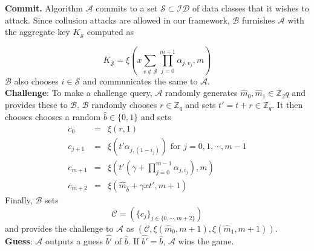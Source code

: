 \noindent\textbf{Commit.} Algorithm $\mathcal{A}$ commits to a set ${\mathcal{S}} \subset \mathcal{ID}$ of data classes that it wishes to attack. Since collusion attacks are allowed in our framework, $\mathcal{B}$ furnishes $\mathcal{A}$ with the aggregate key $K_{\overline{\mathcal{S}}}$ computed as

\begin{equation}
 K_{\overline{\mathcal{S}}} = \xi\left(x\sum_{v\notin\mathcal{S}}{\prod_{j=0}^{m-1}\alpha_{j,v_j}},m\right)\nonumber
\end{equation}
\noindent $\mathcal{B}$ also chooses $i\in\mathcal{S}$ and communicates the same to $\mathcal{A}$.\\

\noindent\textbf{Challenge}: To make a challenge query, $\mathcal{A}$  randomly generates $\hat{m}_0,\hat{m}_1\in\mathbb{Z}_2q$ and provides these to $\mathcal{B}$. $\mathcal{B}$ randomly chooses $r\in\mathbb{Z}_q$ and sets $t'=t+r \in\mathbb{Z}_q$. It then chooses chooses a random $\hat{b}\in\{0,1\}$ and sets
\begin{eqnarray}
 c_0&=&\xi(r,1)\nonumber\\
 c_{j+1}&=&\xi(t'\alpha_{j,\left(1-i_{j}\right)}) \text{ for } j=0,1,\cdots,m-1\nonumber\\
 c_{m+1}&=&\xi(t'(\gamma+\prod_{j=0}^{m-1}\alpha_{j,i_j}),m)\nonumber\\
 c_{m+2}&=& \xi(\hat{m}_{\hat{b}}+\gamma xt',m+1)\nonumber
\end{eqnarray}
\noindent Finally, $\mathcal{B}$ sets 
\begin{equation}
 \mathcal{C}=(\{c_j\}_{j\in\{0,\cdots,m+2\}})\nonumber
\end{equation}
\noindent and provides the challenge to $\mathcal{A}$ as $(\mathcal{C},\xi(\hat{m}_0,m+1),\xi(\hat{m}_1,m+1))$.\\
 
 
\noindent\textbf{Guess}: $\mathcal{A}$ outputs a guess $\hat{b'}$ of $\hat{b}$. If $\hat{b'} = \hat{b}$, $\mathcal{A}$ wins the game.\\

